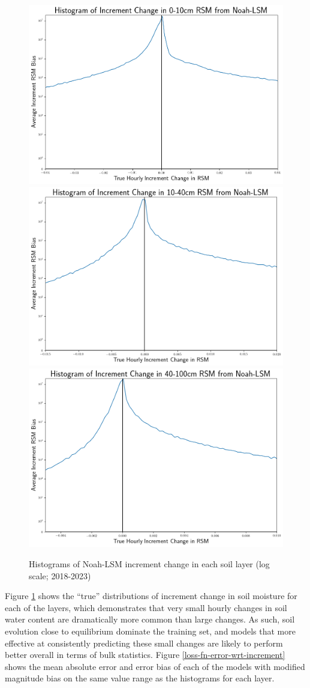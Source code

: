 \begin{figure}[hp!]
    \centering
    \includegraphics[width=.32\linewidth,draft=false]{figures/error-wrt-increment-change/eval_test_rsm-10_increment-error-1d_hist-log.png}
    \includegraphics[width=.32\linewidth,draft=false]{figures/error-wrt-increment-change/eval_test_rsm-40_increment-error-1d_hist-log.png}
    \includegraphics[width=.32\linewidth,draft=false]{figures/error-wrt-increment-change/eval_test_rsm-100_increment-error-1d_hist-log.png}

    \caption{Histograms of Noah-LSM increment change in each soil layer (log scale; 2018-2023)}
    \label{hists-increment}
\end{figure}

Figure \ref{hists-increment} shows the ``true'' distributions of increment change in soil moisture for each of the layers, which demonstrates that very small hourly changes in soil water content are dramatically more common than large changes. As such, soil evolution close to equilibrium dominate the training set, and models that more effective at consistently predicting these small changes are likely to perform better overall in terms of bulk statistics. Figure \ref{loss-fn-error-wrt-increment} shows the mean absolute error and error bias of each of the models with modified magnitude bias on the same value range as the histograms for each layer.

